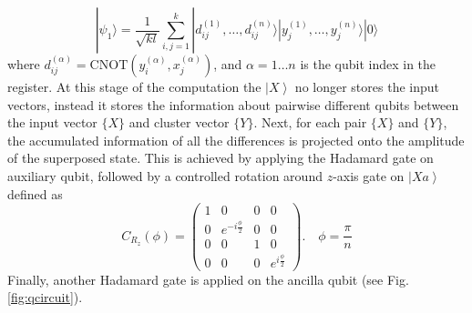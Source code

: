 \documentclass[pra,showkeys,twocolumn,showpacs]{revtex4-1}
\begin{document}
\begin{equation}
    | \psi_1 \rangle  =  
    \frac{1}{\sqrt{kl}} \sum_{i, j=1}^{k} 
    | d^{(1)}_{ij}, \dots, d^{(n)}_{ij} \rangle 
    | y^{(1)}_j, \dots, y^{(n)}_j \rangle
    | 0 \rangle 
\end{equation}
%
where $d^{(\alpha)}_{ij} = \mathrm{CNOT}(y^{(\alpha)}_i, x^{(\alpha)}_j)$, and $\alpha = 1 \dots n$  is the qubit index in the register. 
At this stage of the computation the $\left| X \right\rangle$ no longer stores the input vectors,
instead it stores the information about pairwise different qubits between the input vector $\{X\}$ and cluster vector $\{Y\}$. 
Next, for each pair $\{X\}$ and $\{Y\}$, the accumulated information of all the differences is projected onto the amplitude of the superposed state. 
This is achieved by applying the Hadamard gate on auxiliary qubit, 
followed by a controlled rotation around $z$-axis gate on $\left| Xa \right\rangle$ defined as
%
\begin{equation}
    \label{eq:controled_rotation}
    C_{R_z}(\phi) = 
    \begin{pmatrix}
        1 & 0 & 0 & 0 \\
        0 & e^{-i \frac \phi 2} & 0 & 0 \\
        0 & 0 & 1 & 0 \\
		0 & 0 & 0 & e^{i \frac \phi 2}
    \end{pmatrix} .
    \quad \phi = \frac{\pi}{n}
\end{equation}
%
Finally, another Hadamard gate is applied on the ancilla qubit (see Fig. \ref{fig:qcircuit}). 
\end{document}
